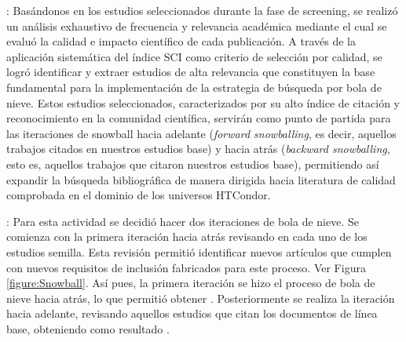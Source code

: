 : Basándonos en los \screenTot{} estudios seleccionados durante la fase de screening, se realizó un análisis exhaustivo de frecuencia y relevancia académica mediante el cual se evaluó la calidad e impacto científico de cada publicación. A través de la aplicación sistemática del índice SCI  como criterio de selección por calidad, se logró identificar y extraer \csiSelected{} estudios de alta relevancia que constituyen la base fundamental para la implementación de la estrategia de búsqueda por bola de nieve. Estos estudios seleccionados, caracterizados por su alto índice de citación y reconocimiento en la comunidad científica, servirán como punto de partida para las iteraciones de snowball hacia adelante (\textit{forward snowballing}, es decir, aquellos trabajos citados en nuestros estudios base) y hacia atrás (\textit{backward snowballing}, esto es, aquellos trabajos que citaron nuestros estudios base), permitiendo así expandir la búsqueda bibliográfica de manera dirigida hacia literatura de calidad comprobada en el dominio de los universos HTCondor.

: Para esta actividad se decidió hacer dos iteraciones de bola de nieve. Se comienza con la primera iteración hacia atrás revisando en cada uno de los \csiSelected{} estudios semilla. Esta revisión permitió identificar nuevos artículos que cumplen con nuevos requisitos de inclusión fabricados para este proceso. Ver Figura \ref{figure:Snowball}. Así pues, la primera iteración se hizo el proceso de bola de nieve hacia atrás, lo que permitió obtener \firstBackwardSnowballStudies.  Posteriormente se realiza la iteración hacia adelante, revisando aquellos estudios que citan los documentos de línea base, obteniendo como resultado \firstForwardSnowballStudies{}.

